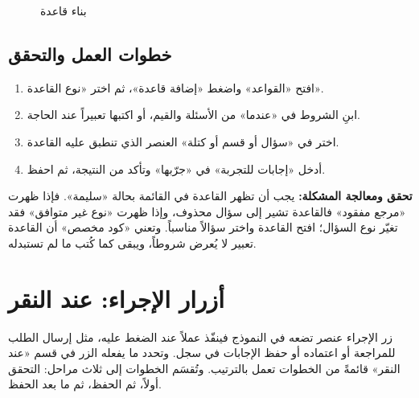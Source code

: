 \begin{figure}[H]
\centering
{}
\rclegend
\caption{بناء قاعدة}
\label{fig:builder-forms-rules-flow}
\end{figure}

\subsection{خطوات العمل والتحقق}
\begin{enumerate}
\item افتح «القواعد» واضغط «إضافة قاعدة»، ثم اختر «نوع القاعدة».
\item ابنِ الشروط في «عندما» من الأسئلة والقيم، أو اكتبها تعبيراً عند الحاجة.
\item اختر في «سؤال أو قسم أو كتلة» العنصر الذي تنطبق عليه القاعدة.
\item أدخل «إجابات للتجربة» في «جرّبها» وتأكد من النتيجة، ثم احفظ.
\end{enumerate}

\textbf{تحقق ومعالجة المشكلة:} يجب أن تظهر القاعدة في القائمة بحالة «سليمة». فإذا ظهرت «مرجع مفقود» فالقاعدة تشير إلى سؤال محذوف، وإذا ظهرت «نوع غير متوافق» فقد تغيّر نوع السؤال؛ افتح القاعدة واختر سؤالاً مناسباً. وتعني «كود مخصص» أن القاعدة تعبير لا يُعرض شروطاً، ويبقى كما كُتب ما لم تستبدله.

\clearpage
\section{أزرار الإجراء: عند النقر}
\label{sec:builder-feature-forms-buttons}

زر الإجراء عنصر تضعه في النموذج فينفّذ عملاً عند الضغط عليه، مثل إرسال الطلب للمراجعة أو اعتماده أو حفظ الإجابات في سجل. وتحدد ما يفعله الزر في قسم «عند النقر» قائمةً من الخطوات تعمل بالترتيب. وتُقسَم الخطوات إلى ثلاث مراحل: التحقق أولاً، ثم الحفظ، ثم ما بعد الحفظ.

